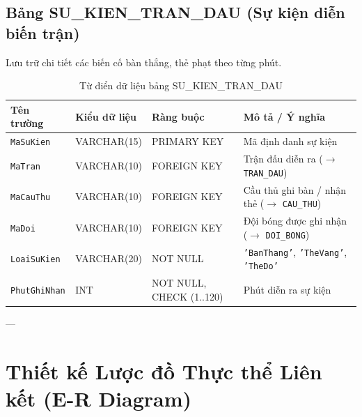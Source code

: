 \subsection{Bảng SU\_KIEN\_TRAN\_DAU (Sự kiện diễn biến trận)}
Lưu trữ chi tiết các biến cố bàn thắng, thẻ phạt theo từng phút.
\begin{table}[H]
\centering
\small
\begin{tabular}{|l|l|l|p{6cm}|}
\hline
\textbf{Tên trường} & \textbf{Kiểu dữ liệu} & \textbf{Ràng buộc} & \textbf{Mô tả / Ý nghĩa} \\ \hline
\texttt{MaSuKien} & VARCHAR(15) & PRIMARY KEY & Mã định danh sự kiện \\ \hline
\texttt{MaTran} & VARCHAR(10) & FOREIGN KEY & Trận đấu diễn ra ($\rightarrow$ \texttt{TRAN\_DAU}) \\ \hline
\texttt{MaCauThu} & VARCHAR(10) & FOREIGN KEY & Cầu thủ ghi bàn / nhận thẻ ($\rightarrow$ \texttt{CAU\_THU}) \\ \hline
\texttt{MaDoi} & VARCHAR(10) & FOREIGN KEY & Đội bóng được ghi nhận ($\rightarrow$ \texttt{DOI\_BONG}) \\ \hline
\texttt{LoaiSuKien} & VARCHAR(20) & NOT NULL & \texttt{'BanThang'}, \texttt{'TheVang'}, \texttt{'TheDo'} \\ \hline
\texttt{PhutGhiNhan} & INT & NOT NULL, CHECK (1..120) & Phút diễn ra sự kiện \\ \hline
\end{tabular}
\caption{Từ điển dữ liệu bảng SU\_KIEN\_TRAN\_DAU}
\end{table}

---

\section{Thiết kế Lược đồ Thực thể Liên kết (E-R Diagram)}

